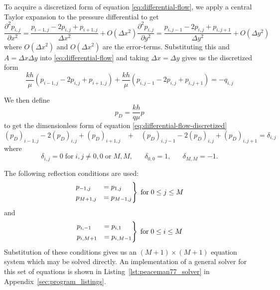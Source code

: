 To acquire a discretized form of equation \eqref{eq:differential-flow}, we apply a central Taylor expansion to the pressure differential to get
\begin{subequations}
    \begin{equation}
        \frac{\partial^2 p_{i,j}}{\partial x^2} = \frac{p_{i-1,j} -2p_{i,j} + p_{i+1,j}}{\Delta x^2} + O(\Delta x^2)
    \end{equation}
    \begin{equation}
        \frac{\partial^2 p_{i,j}}{\partial y^2} = \frac{p_{i,j-1} -2p_{i,j} + p_{i,j+1}}{\Delta y^2} + O(\Delta y^2)
    \end{equation}
\end{subequations}
where $O(\Delta x^2)$ and $O(\Delta x^2)$ are the error-terms. Substituting this and $A=\Delta x \Delta y$ into \eqref{eq:differential-flow} and taking $\Delta x = \Delta y$ gives us the discretized form
\begin{equation}
    \label{eq:differential-flow-discretized}
    \frac{kh}{\mu} \left( p_{i-1,j} -2p_{i,j} + p_{i+1,j} \right) + \frac{kh}{\mu} \left( p_{i,j-1} -2p_{i,j} + p_{i,j+1} \right) = -q_{i,j}
\end{equation}

We then define
\begin{equation}
    p_D = \frac{kh}{q\mu} p
\end{equation}
to get the dimensionless form of equation \eqref{eq:differential-flow-discretized} \cite{Peaceman1978Interpretation}
\begin{equation}
    \label{eq:differential-flow-discretzed-dimensionless}
     (p_D)_{i-1,j} -2(p_D)_{i,j} + (p_D)_{i+1,j} \;\;\; + \;\;\; (p_D)_{i,j-1} -2(p_D)_{i,j} + (p_D)_{i,j+1}  = \delta_{i,j}
\end{equation}
where
\begin{equation}
    \delta_{i,j} = 0 \;\mathrm{for}\; i,j \neq 0,0 \;\mathrm{or}\; M,M, \;\;\;\;\;\;
    \delta_{0,0} = 1, \;\;\;\;\;\;
    \delta_{M,M} = -1.
\end{equation}

The following reflection conditions are used:
\begin{equation}
    \begin{rcases}
        p_{-1,j} &= p_{1,j} \\
        p_{M+1,j} &= p_{M-1,j}
    \end{rcases} \; \mathrm{for} \; 0\leq j \leq M
\end{equation}
and
\begin{equation}
    \begin{rcases}
        p_{i,-1} &= p_{i,1} \\
        p_{i,M+1} &= p_{i,M-1}
    \end{rcases} \; \mathrm{for} \; 0\leq i \leq M
\end{equation}
Substitution of these conditions gives us an $(M+1)\times (M+1)$ equation system which may be solved directly. An implementation of a general solver for this set of equations is shown in Listing~\ref{lst:peaceman77_solver} in Appendix~\ref{sec:program_listings}.






